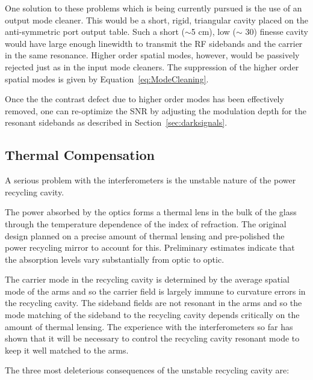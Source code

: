 One solution to these problems which is being currently pursued is the use of an
output mode cleaner. This would be a short, rigid, triangular cavity placed on
the anti-symmetric port output table. Such a short ($\sim$5 cm), low 
($\sim$ 30) finesse cavity would have large enough linewidth to transmit the 
RF sidebands and the carrier in the same resonance. Higher order spatial modes, 
however, would be passively rejected just as in the input mode cleaners. 
The suppression of the higher 
order spatial modes is given by Equation~\ref{eq:ModeCleaning}.

Once the the contrast defect due to higher order modes has been effectively
removed, one can re-optimize the SNR by adjusting the modulation depth for
the resonant sidebands as described in Section~\ref{sec:darksignals}.


\subsection{Thermal Compensation}
\label{sec:ThermalComp}

A serious problem with the interferometers is the unstable nature
of the power recycling cavity. 

The power absorbed by the optics forms a thermal lens in the bulk of the glass
through the temperature dependence of the index of refraction. The original design 
planned on a precise amount
of thermal lensing and pre-polished the power recycling mirror to account for this.
Preliminary estimates indicate that the absorption levels vary substantially
from optic to optic. 

The carrier mode in the recycling cavity is determined by the average spatial mode
of the arms and so the carrier field is largely immune to curvature errors in the
recycling cavity. The sideband fields are not resonant in the arms and so the
mode matching of the sideband to the recycling cavity depends critically on the
amount of thermal lensing. The experience with the interferometers so far has
shown that it will be necessary to control the recycling cavity resonant mode
to keep it well matched to the arms. 

The three most deleterious consequences of the unstable recycling cavity are:

